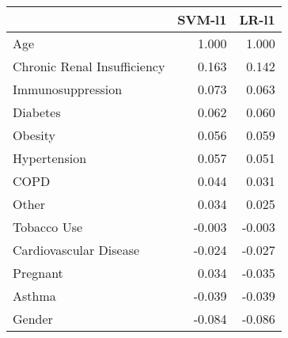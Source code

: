 \begin{tabular}{lrr}
\toprule
{} &  SVM-l1 &  LR-l1 \\
\midrule
Age                         &   1.000 &  1.000 \\
Chronic Renal Insufficiency &   0.163 &  0.142 \\
Immunosuppression           &   0.073 &  0.063 \\
Diabetes                    &   0.062 &  0.060 \\
Obesity                     &   0.056 &  0.059 \\
Hypertension                &   0.057 &  0.051 \\
COPD                        &   0.044 &  0.031 \\
Other                       &   0.034 &  0.025 \\
Tobacco Use                 &  -0.003 & -0.003 \\
Cardiovascular Disease      &  -0.024 & -0.027 \\
Pregnant                    &   0.034 & -0.035 \\
Asthma                      &  -0.039 & -0.039 \\
Gender                      &  -0.084 & -0.086 \\
\bottomrule
\end{tabular}
